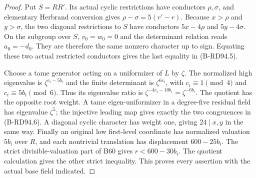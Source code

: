 \begin{proof}
Put $S=RR'$. Its actual cyclic restrictions have conductors
$\rho,\sigma$, and elementary Herbrand conversion gives
$\rho-\sigma=5(r'-r)$. Because $x>\rho$ and $y>\sigma$, the
two diagonal restrictions to $S$ have conductors
$5x-4\rho$ and $5y-4\sigma$. On the subgroup over $S$,
$v_0=w_0=0$ and the determinant relation reads $a_0=-d_0$.
They are therefore the same nonzero character up to sign. Equating
these two actual restricted conductors gives the last equality in
(B-RD94.5).

Choose a tame generator acting on a uniformizer of $L$ by $\zeta$.
The normalized high eigenvalue is $\zeta^{c_i-5b_i}$ and the
finite determinant is $\zeta^{6c_i}$, with $c_i\equiv1\pmod4$ and
$c_i\equiv5b_i\pmod6$. Thus its eigenvalue ratio is
$\zeta^{-4c_i-10b_i}=\zeta^{-6b_i}$. The quotient has the
opposite root weight. A tame eigen-uniformizer in a degree-five
residual field has eigenvalue $\zeta^5$; the injective leading
map gives exactly the two congruences in (B-RD94.6). A diagonal
cyclic character has weight one, giving $24\mid x,y$ in the same
way. Finally an original low first-level coordinate has normalized
valuation $5b_i$ over $R$, and each nontrivial translation has
displacement $600-25b_i$. The strict divisible-valuation part of
B60 gives $r<600-30b_i$. The quotient calculation gives the other
strict inequality. This proves every assertion with the actual
base field indicated.
\end{proof}

